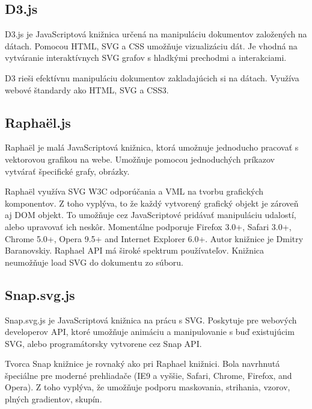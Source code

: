 \subsection{D3.js}

D3.js je JavaScriptová knižnica určená na manipuláciu dokumentov založených na dátach. Pomocou \acs{HTML}, \acs{SVG} a \acs{CSS} umožňuje vizualizáciu dát.
Je vhodná na vytváranie interaktívnych SVG grafov s hladkými prechodmi a interakciami. 

D3 rieši efektívnu manipuláciu dokumentov zakladajúcich si na dátach. Využíva webové štandardy ako \acs{HTML}, \acs{SVG} a \acs{CSS}3. \cite{d3js}

\subsection{Raphaël.js}

Raphaël je malá JavaScriptová knižnica, ktorá umožnuje jednoducho pracovať s vektorovou grafikou na webe. Umožňuje pomocou jednoduchých príkazov vytvárať špecifické grafy, obrázky. 

Raphaël využíva \acs{SVG} \acs{W3C} odporúčania a \acs{VML} na tvorbu grafických komponentov. Z toho vyplýva, to že každý vytvorený grafický objekt je zároveň aj DOM objekt. To umožňuje cez JavaScriptové pridávať manipuláciu udalostí, alebo upravovať ich neskôr.
Momentálne podporuje Firefox 3.0+, Safari 3.0+, Chrome 5.0+, Opera 9.5+ and Internet Explorer 6.0+.\cite{Raphael}
Autor knižnice je Dmitry Baranovskiy. Raphael API má široké spektrum používateľov. 
Knižnica neumožňuje load SVG do dokumentu zo súboru. 



\subsection{Snap.svg.js}

Snap.svg.js je JavaScriptová knižnica na prácu s SVG. Poskytuje pre webových developerov \acs{API}, ktoré umožňuje animáciu a manipulovanie s buď existujúcim SVG, alebo programátorsky vytvorene cez Snap API. 


Tvorca Snap knižnice je rovnaký ako pri Raphael knižnici.  Bola navrhnutá špeciálne pre moderné prehliadače (IE9 a vyššie, Safari, Chrome, Firefox, and Opera). Z toho vyplýva, že umožňuje podporu maskovania, strihania, vzorov, plných gradientov, skupín. 

